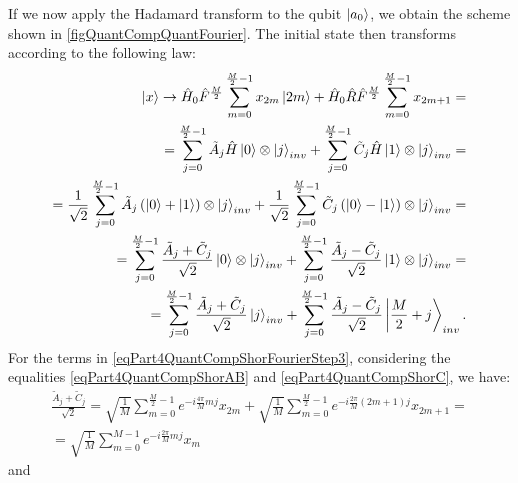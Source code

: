 

If we now apply the Hadamard transform  to the qubit $\ket{a_0}$, we obtain the scheme shown in \autoref{figQuantCompQuantFourier}. The initial state then transforms according to the following law:
\begin{eqnarray}
\ket{x} \rightarrow
\hat{H}_0\hat{F}^{\frac{M}{2}} \sum_{m = 0}^{\frac{M}{2} - 1}x_{2m} \ket{2m} +
\hat{H}_0\hat{R}\hat{F}^{\frac{M}{2}}\sum_{m = 0}^{\frac{M}{2} - 1} x_{2m + 1} =
\nonumber \\
=
\sum_{j = 0}^{\frac{M}{2} - 1}
\tilde{A}_{j}
\hat{H}\ket{0} \otimes \ket{j}_{inv}
+
\sum_{j = 0}^{\frac{M}{2} - 1} 
\tilde{C}_{j}
\hat{H}\ket{1} \otimes \ket{j}_{inv} 
=
\nonumber \\
= 
\frac{1}{\sqrt{2}}\sum_{j = 0}^{\frac{M}{2} - 1}
\tilde{A}_{j} 
\left(\ket{0} + \ket{1} \right) \otimes  
\ket{j}_{inv}
+
\frac{1}{\sqrt{2}}\sum_{j = 0}^{\frac{M}{2} - 1}
\tilde{C}_{j} 
\left(\ket{0} - \ket{1} \right) \otimes  
\ket{j}_{inv}
=
\nonumber \\
=
\sum_{j = 0}^{\frac{M}{2} - 1}
\frac{\tilde{A}_{j} + \tilde{C}_{j} }{\sqrt{2}} 
\ket{0} \otimes \ket{j}_{inv} +
\sum_{j = 0}^{\frac{M}{2} - 1}
\frac{ \tilde{A}_{j} - \tilde{C}_{j}}{\sqrt{2}} 
\ket{1} \otimes \ket{j}_{inv}
=
\nonumber \\
=
\sum_{j = 0}^{\frac{M}{2} - 1}
\frac{\tilde{A}_{j} + \tilde{C}_{j} }{\sqrt{2}} \ket{j}_{inv} +
\sum_{j = 0}^{\frac{M}{2} - 1}
\frac{ \tilde{A}_{j} - \tilde{C}_{j}}{\sqrt{2}} 
\left|\frac{M}{2} + j \right>_{inv}.
\label{eqPart4QuantCompShorFourierStep3}
\end{eqnarray}
For the terms in \eqref{eqPart4QuantCompShorFourierStep3}, considering the equalities \eqref{eqPart4QuantCompShorAB} and \eqref{eqPart4QuantCompShorC}, we have:
\begin{eqnarray}
\frac{\tilde{A}_{j} + \tilde{C}_{j} }{\sqrt{2}} = 
\sqrt{\frac{1}{M}} 
\sum_{m = 0}^{\frac{M}{2} - 1} e^{-i \frac{4 \pi}{M} m j} x_{2m}  +
\sqrt{\frac{1}{M}} 
\sum_{m = 0}^{\frac{M}{2} - 1} 
e^{-i \frac{2 \pi}{M} \left(2m+1\right) j} x_{2m+1} = 
\nonumber \\
=
\sqrt{\frac{1}{M}} \sum_{m = 0}^{M - 1}
e^{-i \frac{2 \pi}{M} m j} x_{m}
\label{eqPart4QuantCompShorFourierStep3_1}
\end{eqnarray}
and
